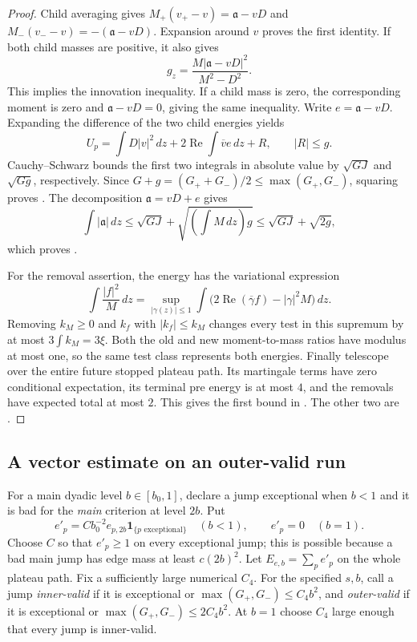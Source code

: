 \begin{proof}
Child averaging gives
$M_+(v_+-v)=\mathfrak a-vD$ and $M_-(v_--v)=-(\mathfrak a-vD)$.  Expansion around $v$ proves the
first identity.  If both child masses are positive, it also gives
\[
 g_z=\frac{M|\mathfrak a-vD|^2}{M^2-D^2}.
\]
This implies the innovation inequality.  If a child mass is zero, the
corresponding moment is zero and $\mathfrak a-vD=0$, giving the same inequality.
Write $e=\mathfrak a-vD$.  Expanding the difference of the two child energies yields
\[
 U_p=\int D|v|^2\,dz+2\operatorname{Re}\int\overline v e\,dz+R,
 \qquad |R|\le g.
\]
Cauchy--Schwarz bounds the first two integrals in absolute value by
$\sqrt{GJ}$ and $\sqrt{Gg}$, respectively.  Since
$G+g=(G_++G_-)/2\le\max(G_+,G_-)$, squaring proves
.  The decomposition $\mathfrak a=vD+e$ gives
\[
 \int|\mathfrak a|\,dz\le\sqrt{GJ}+\sqrt{\left(\int M\,dz\right)g}
                  \le\sqrt{GJ}+\sqrt{2g},
\]
which proves .

For the removal assertion, the energy has the variational expression
\[
 \int\frac{|f|^2}{M}\,dz
 =\sup_{|\gamma(z)|\le1}
       \int\big(2\operatorname{Re}(\overline\gamma f)-|\gamma|^2M\big)\,dz.
\]
Removing $k_M\ge0$ and $k_f$ with $|k_f|\le k_M$ changes every test in this
supremum by at most $3\int k_M=3\xi$.  Both the old and new moment-to-mass
ratios have modulus at most one, so the same test class represents both
energies.  Finally telescope  over the entire
future stopped plateau path.  Its martingale terms have zero conditional
expectation, its terminal pre energy is at most $4$, and the removals have
expected total at most $2$.  This gives the first bound in
.  The other two are
.
\end{proof}

\subsection{A vector estimate on an outer-valid run}

For a main dyadic level $b\in[b_0,1]$, declare a jump exceptional when
$b<1$ and it is bad for the \emph{main} criterion at level $2b$.  Put
\[
 e'_p=C b_0^{-2}e_{p,2b}\mathbf1_{\{p\text{ exceptional}\}}
       \quad(b<1),\qquad e'_p=0\quad(b=1).
\]
Choose $C$ so that $e'_p\ge1$ on every exceptional jump; this is possible
because a bad main jump has edge mass at least $c(2b)^2$.  Let
$E_{e,b}=\sum_p e'_p$ on the whole plateau path.  Fix a sufficiently large
numerical $C_4$.  For the specified $s,b$, call a jump \emph{inner-valid}
if it is exceptional or $\max(G_+,G_-)\le C_4b^2$, and \emph{outer-valid}
if it is exceptional or $\max(G_+,G_-)\le2C_4b^2$.  At $b=1$ choose $C_4$
large enough that every jump is inner-valid.


